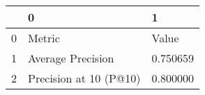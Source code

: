\begin{tabular}{lll}
\toprule
 & 0 & 1 \\
\midrule
0 & Metric & Value \\
1 & Average Precision & 0.750659 \\
2 & Precision at 10 (P@10) & 0.800000 \\
\bottomrule
\end{tabular}
